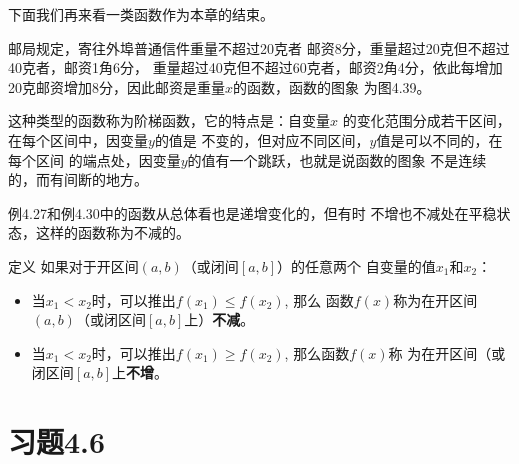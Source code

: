 下面我们再来看一类函数作为本章的结束。

\begin{example}
邮局规定，寄往外埠普通信件重量不超过20克者
邮资8分，重量超过20克但不超过40克者，邮资1角6分，
重量超过40克但不超过60克者，邮资2角4分，依此每增加
20克邮资增加8分，因此邮资是重量$x$的函数，函数的图象
为图4.39。
\begin{figure}[htp]
    \centering
{}
    \caption{}
\end{figure}

这种类型的函数称为阶梯函数，它的特点是：自变量$x$
的变化范围分成若干区间，在每个区间中，因变量$y$的值是
不变的，但对应不同区间，$y$值是可以不同的，在每个区间
的端点处，因变量$y$的值有一个跳跃，也就是说函数的图象
不是连续的，而有间断的地方。

例4.27和例4.30中的函数从总体看也是递增变化的，但有时
不增也不减处在平稳状态，这样的函数称为不减的。

    
\end{example}

\begin{blk}{定义}
    如果对于开区间$(a,b)$（或闭间$[a,b]$）的任意两个
  自变量的值$x_1$和$x_2$：
  \begin{itemize}
      \item 当$x_1<x_2$时，可以推出$f(x_1)\le f(x_2)$, 那么
  函数$f(x)$称为在开区间$(a,b)$（或闭区间$[a,b]$上）\textbf{不减}。
\item  当$x_1<x_2$时，可以推出$f(x_1)\ge f(x_2)$, 那么函数$f(x)$称
  为在开区间（或闭区间$[a,b]$上\textbf{不增}。   
  \end{itemize}
  \end{blk}
  
  
  



\section*{习题4.6}

